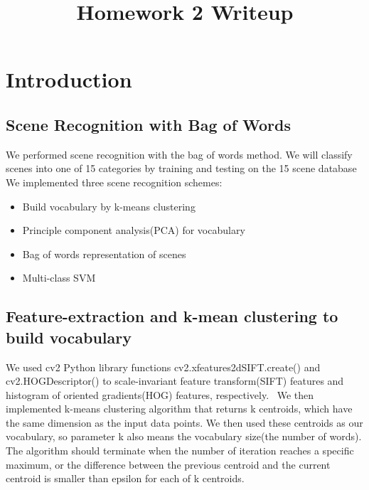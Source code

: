 \title{\vspace{-1cm}Homework 2 Writeup}



\maketitle
\vspace{-3cm}
\thispagestyle{fancy}



\section*{Introduction}
\vspace{-5pt}
\subsection*{Scene Recognition with Bag of Words}
\vspace{-5pt}


We performed scene recognition with the bag of words method. We will classify scenes into one of 15 categories by training and testing on the 15 scene database
We implemented three scene recognition schemes:
\vspace{-5pt}
\begin{itemize}
    \item  Build vocabulary by k-means clustering
    \vspace{-5pt}
    \item Principle component analysis(PCA) for vocabulary
    \vspace{-5pt}
    \item Bag of words representation of scenes
    \vspace{-5pt}
    \item Multi-class SVM
\end{itemize}{}
\vspace{-15pt}

\subsection*{Feature-extraction and k-mean clustering to build vocabulary}
\vspace{-5pt}
We used cv2 Python library functions cv2.xfeatures2dSIFT.create() and cv2.HOGDescriptor() to scale-invariant feature transform(SIFT) features and histogram of oriented gradients(HOG) features, respectively. \
We then implemented k-means clustering algorithm that returns k centroids, which have the same dimension as the input data points. We then used these centroids as our vocabulary, so parameter k also means the vocabulary size(the number of words). The algorithm should terminate when the number of iteration reaches a specific maximum, or the difference between the previous centroid and the current centroid is smaller than epsilon for each of k centroids. \

